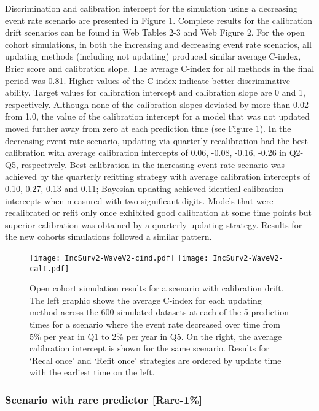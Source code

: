\documentclass[]{article}
\begin{document}
Discrimination and calibration intercept for the simulation using a decreasing event rate scenario are presented in Figure \ref{fig:calDrift}. Complete results for the calibration drift scenarios can be found in Web Tables 2-3 and Web Figure 2. For the open cohort simulations, in both the increasing and decreasing event rate scenarios, all updating methods (including not updating) produced similar average C-index, Brier score and calibration slope. The average C-index for all methods in the final period was 0.81. Higher values of the C-index indicate better discriminative ability. Target values for calibration intercept and calibration slope are 0 and 1, respectively. Although none of the calibration slopes deviated by more than 0.02 from 1.0, the value of the calibration intercept for a model that was not updated moved further away from zero at each prediction time (see Figure \ref{fig:calDrift}). In the decreasing event rate scenario, updating via quarterly recalibration had the best calibration with average calibration intercepts of  0.06, -0.08, -0.16, -0.26 in Q2-Q5, respectively. Best calibration in the increasing event rate scenario was achieved by the quarterly refitting strategy with average calibration intercepts of 0.10, 0.27, 0.13 and 0.11; Bayesian updating achieved identical calibration intercepts when measured with two significant digits. Models that were recalibrated or refit only once exhibited good calibration at some time points but superior calibration was obtained by a quarterly updating strategy. Results for the new cohorts simulations followed a similar pattern.

\begin{figure}
	{\texttt{[image: IncSurv2-WaveV2-cind.pdf]}} 
	{\texttt{[image: IncSurv2-WaveV2-calI.pdf]}}
	\caption{Open cohort simulation results for a scenario with calibration drift. The left graphic shows the average C-index for each updating method across the 600 simulated datasets at each of the 5 prediction times for a scenario where the event rate decreased over time from 5\% per year in Q1 to 2\% per year in Q5. On the right, the average calibration intercept is shown for the same scenario. Results for `Recal once' and `Refit once' strategies are ordered by update time with the earliest time on the left.   }
	\label{fig:calDrift}
\end{figure}


\subsubsection{Scenario with rare predictor [Rare-1\%]}
\end{document}
